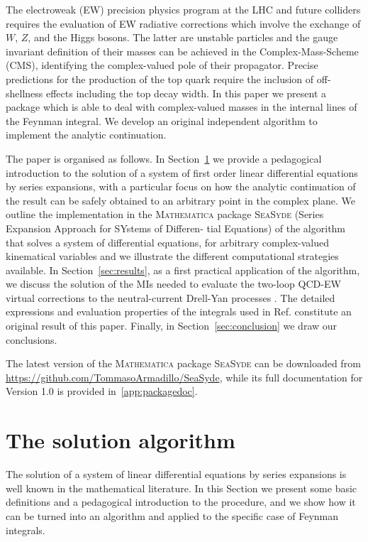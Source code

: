 \documentclass[final,1p,times]{elsarticle}
\begin{document}
 
 The electroweak (EW) precision physics program at the LHC and future colliders requires the evaluation of EW radiative corrections which involve the exchange of $W$, $Z$, and the Higgs bosons. The latter are unstable particles and the gauge invariant definition of their masses can be achieved in the Complex-Mass-Scheme (CMS)\cite{Denner:2005fg}, identifying the complex-valued pole of their propagator. Precise predictions for the production of the top quark require the inclusion of off-shellness effects including the top decay width.
 In this paper we present a package which is able to deal with complex-valued masses in the internal lines of the Feynman integral. We develop an original independent algorithm to implement the analytic continuation.
 


The paper is organised as follows.
In Section~\ref{sec:series} we provide a pedagogical introduction to the solution of a system of first order linear differential equations by series expansions, with a particular focus on how the analytic continuation of the result can be safely obtained to an arbitrary point in the complex plane. 
We outline the implementation in the \textsc{Mathematica} package \textsc{SeaSyde}  (Series Expansion Approach for SYstems of Differen-
tial Equations) of the algorithm that solves a system of differential equations, for arbitrary complex-valued kinematical variables and we illustrate the different computational strategies available.
In Section~\ref{sec:results}, as a first practical application of the algorithm, we discuss the solution of the MIs needed to evaluate the two-loop QCD-EW virtual corrections to the neutral-current Drell-Yan processes \cite{Bonciani:2021zzf,Armadillo:2022bgm}.
The detailed expressions and evaluation properties of the integrals used in Ref.\cite{Armadillo:2022bgm} constitute an original result of this paper.
Finally, in Section~\ref{sec:conclusion} we draw our conclusions.

The latest version of the \textsc{Mathematica} package \textsc{SeaSyde} can be downloaded from \url{https://github.com/TommasoArmadillo/SeaSyde}, while its full documentation for Version 1.0 is provided in~\ref{app:packagedoc}.



\section{The solution algorithm}
\label{sec:series}
The solution of a system of linear differential equations by series expansions is well known in the mathematical literature.
In this Section we present some basic definitions and a pedagogical introduction to the procedure, and we show how it can be turned into an algorithm and applied to the specific case of Feynman integrals.
\end{document}

